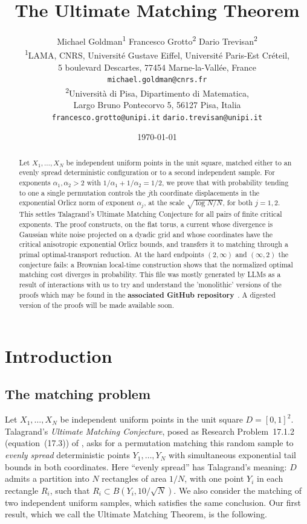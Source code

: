 \documentclass[11pt]{article}
\title{The Ultimate Matching Theorem}
\author{%
Michael Goldman\textsuperscript{1}\qquad
Francesco Grotto\textsuperscript{2}\qquad
Dario Trevisan\textsuperscript{2}\\[0.7em]
\small\textsuperscript{1}LAMA, CNRS, Universit\'e Gustave Eiffel, Universit\'e Paris-Est Cr\'eteil,\\
\small 5 boulevard Descartes, 77454 Marne-la-Vall\'ee, France\\[-0.1em]
\small\texttt{michael.goldman@cnrs.fr}\\[0.65em]
\small\textsuperscript{2}Universit\`a di Pisa, Dipartimento di Matematica,\\
\small Largo Bruno Pontecorvo 5, 56127 Pisa, Italia\\[-0.1em]
\small\texttt{francesco.grotto@unipi.it}\quad
\texttt{dario.trevisan@unipi.it}
}
\date{\today}
\theoremstyle{definition}
\theoremstyle{remark}
\numberwithin{equation}{section}
\begin{document}
\maketitle
\begin{abstract}
Let $X_1,\dots,X_N$ be independent uniform points in the unit square,
matched either to an evenly spread deterministic configuration or to a
second independent sample. For exponents $\alpha_1,\alpha_2>2$ with
$1/\alpha_1+1/\alpha_2=1/2$, we prove that with probability tending to
one a single permutation controls the $j$th coordinate displacements in
the exponential Orlicz norm of exponent $\alpha_j$, at the scale
$\sqrt{\log N/N}$, for both $j=1,2$. This settles Talagrand's Ultimate
Matching Conjecture for all pairs of finite critical exponents. The
proof constructs, on the flat torus, a current whose divergence is
Gaussian white noise projected on a dyadic grid and whose coordinates
have the critical anisotropic exponential Orlicz bounds, and transfers
it to matching through a primal optimal-transport reduction. At the
hard endpoints $(2,\infty)$ and $(\infty,2)$ the conjecture fails: a
Brownian local-time construction shows that the normalized optimal
matching cost diverges in probability. This file was mostly generated by LLMs as a result of  interactions with us
 to try and understand the 'monolithic' versions of the proofs which may be found in the
 \textbf{associated GitHub repository}~\cite{umc:repository}.
A digested version of the proofs will be made available soon. 
\end{abstract}

\setcounter{tocdepth}{1}
\tableofcontents

\section{Introduction}\label{umc:integrated-overview}

\subsection{The matching problem}
Let $X_1,\ldots,X_N$ be independent uniform points in the unit square
$D=[0,1]^2$. Talagrand's \emph{Ultimate Matching Conjecture}, posed as
Research Problem~17.1.2 (equation~(17.3)) of
\cite{umc:Talagrand2021}, asks for a permutation matching this random
sample to \emph{evenly spread} deterministic points $Y_1,\ldots,Y_N$
with simultaneous exponential tail bounds in both coordinates.
Here ``evenly spread'' has Talagrand's meaning: $D$ admits
a partition into $N$ rectangles of area $1/N$, with one point $Y_i$
in each rectangle $R_i$, such that
$R_i\subset B(Y_i,10/\sqrt N)$. We also consider the matching of
two independent uniform samples, which satisfies the same conclusion.
Our first result, which we call the Ultimate Matching Theorem, is the
following.
\end{document}
